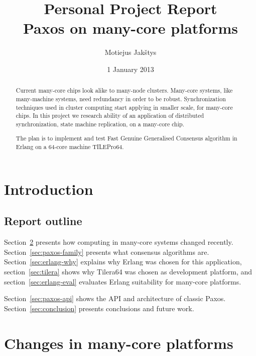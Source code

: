 \documentclass[english,11pt]{l4proj}
\begin{document}
\title{Personal Project Report\\
    Paxos on many-core platforms}
\author{Motiejus Jakštys}
\date{1 January 2013}

\maketitle

\begin{abstract}

Current many-core chips look alike to many-node clusters. Many-core systems,
like many-machine systems, need redundancy in order to be robust.
Synchronization techniques used in cluster computing start applying in smaller
scale, for many-core chips. In this project we research ability of an
application of distributed synchronization, state machine replication, on a
many-core chip.

The plan is to implement and test Fast Genuine Generalised Consensus algorithm
in Erlang on a 64-core machine TILEPro64.

\end{abstract}

\tableofcontents
\pagebreak

\section{Introduction}

\subsection{Report outline}

Section~\ref{sec:many-core} presents how computing in many-core systems changed
recently. Section~\ref{sec:paxos-family} presents what consensus algorithms
are. Section~\ref{sec:erlang-why} explains why Erlang was chosen for this
application, section~\ref{sec:tilera} shows why Tilera64 was chosen as
development platform, and section~\ref{sec:erlang-eval} evaluates Erlang
suitability for many-core platforms.

Section~\ref{sec:paxos-api} shows the API and architecture of classic Paxos.
Section~\ref{sec:conclusion} presents conclusions and future work.

\section{Changes in many-core platforms}
\label{sec:many-core}
\end{document}
